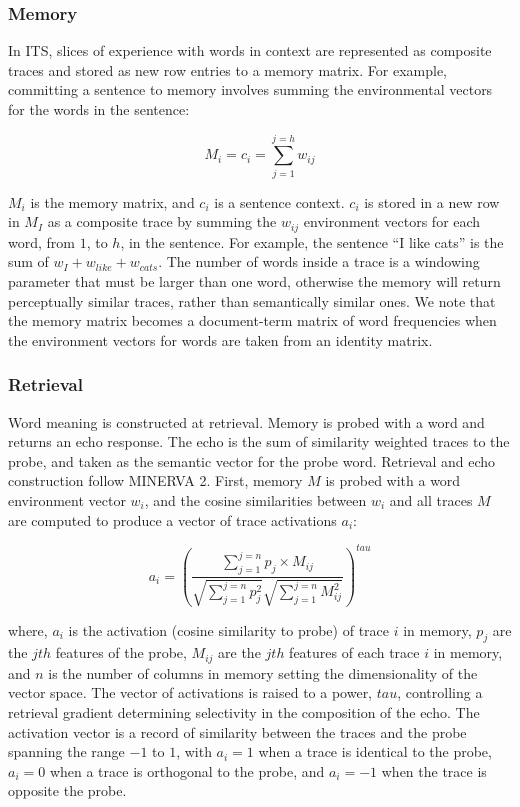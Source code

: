 \documentclass[10pt,letterpaper]{article}
\begin{document}
\subsubsection{Memory}

In ITS, slices of experience with words in context are represented as composite traces and stored as new row entries to a memory matrix. For example, committing a sentence to memory involves summing the environmental vectors for the words in the sentence:

\begin{equation}
M_i = c_i = \sum_{j=1}^{j=h} w_{ij}
\label{eq:memory}
\end{equation}

\(M_i\) is the memory matrix, and \(c_i\) is a sentence context. \(c_i\) is stored in a new row in \(M_I\) as a composite trace by summing the \(w_{ij}\) environment vectors for each word, from \(1\), to \(h\), in the sentence. For example, the sentence ``I like cats'' is the sum of \(w_{I} + w_{like} + w_{cats}\). The number of words inside a trace is a windowing parameter that must be larger than one word, otherwise the memory will return perceptually similar traces, rather than semantically similar ones. We note that the memory matrix becomes a document-term matrix of word frequencies when the environment vectors for words are taken from an identity matrix.

\subsubsection{Retrieval}\label{retrieval}

Word meaning is constructed at retrieval. Memory is probed with a word and returns an echo response. The echo is the sum of similarity weighted traces to the probe, and taken as the semantic vector for the probe word. Retrieval and echo construction follow MINERVA 2. First, memory \(M\) is probed with a word environment vector  \(w_i\), and the cosine similarities between \(w_i\) and all traces \(M\) are computed to produce a vector of trace activations \(a_i\):

\begin{equation}
a_i = (\frac{\sum_{j=1}^{j=n}p_j \times M_{ij}}{\sqrt{\sum_{j=1}^{j=n}p_j^2}\sqrt{\sum_{j=1}^{j=n}M_{ij}^2}})^{tau}
\label{eq:activation}
\end{equation}

where, \(a_i\) is the activation (cosine similarity to probe) of trace \(i\) in memory, \(p_j\) are the \(jth\) features of the probe, \(M_{ij}\) are the \(jth\) features of each trace \(i\) in memory, and \(n\) is the number of columns in memory setting the dimensionality of the vector space. The vector of activations is raised to a power, \({tau}\), controlling a retrieval gradient determining selectivity in the composition of the echo. The activation vector is a record of similarity between the traces and the probe spanning the range \(-1\) to \(1\), with \(a_i = 1\) when a trace is identical to the probe, \(a_i = 0\) when a trace is orthogonal to the probe, and \(a_i = -1\) when the trace is opposite the probe.
\end{document}
